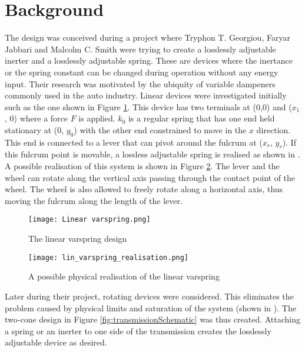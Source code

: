 \documentclass[12pt]{article}
\begin{document}
\pagebreak
\clearpage
{}
 \begin{multicols}{2}{\small \tableofcontents}\end{multicols}

\clearpage
\section{Background}
\label{sec:background}
The design was conceived during a project where Tryphon T. Georgiou, Faryar Jabbari and Malcolm C. Smith were trying to create a losslessly adjustable inerter and a losslessly adjustable spring. \cite{8718377} These are devices where the inertance or the spring constant can be changed during operation without any energy input. Their research was motivated by the ubiquity of variable dampeners commonly used in the auto industry. Linear devices were investigated initially such as the one shown in Figure \ref{fig:linvarspring}. This device has two terminals at (0,0) and ($x_1$, 0) where a force $F$ is applied. $k_0$ is a regular spring that has one end held stationary at (0, $y_0$) with the other end constrained to move in the $x$ direction. This end is connected to a lever that can pivot around the fulcrum at ($x_r$, $y_r$). If this fulcrum point is movable, a lossless adjustable spring is realised as shown in \cite{8718377}. A possible realisation of this system is shown in Figure \ref{fig:linvarspring_physical}. The lever and the wheel can rotate along the vertical axis passing through the contact point of the wheel. The wheel is also allowed to freely rotate along a horizontal axis, thus moving the fulcrum along the length of the lever. 


\begin{figure}[h]
    \centering
    \texttt{[image: Linear varspring.png]}
    \caption{The linear varspring design}
    \label{fig:linvarspring}
\end{figure}

\begin{figure}
    \centering
    \texttt{[image: lin\_varspring\_realisation.png]}
    \caption{A possible physical realisation of the linear varspring }
    \label{fig:linvarspring_physical}
\end{figure}

Later during their project, rotating devices were considered. This eliminates the problem caused by physical limits and saturation of the system (shown in \cite{LUCAS}). The two-cone design in Figure \ref{fig:transmissionSchematic} was thus created. Attaching a spring or an inerter to one side of the transmission creates the losslessly adjustable device as desired. 
\end{document}
